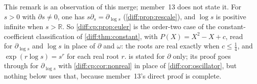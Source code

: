 \documentclass[11pt,letterpaper]{article}
\numberwithin{equation}{section}
\theoremstyle{definition}
\theoremstyle{remark}
\newcommand{\R}{\mathbb R}
\newcommand{\der}{\partial}
\begin{document}
\begin{remark}
\label{diff:cp:rem:constant}
This remark is an observation of this merge; member~13 does not state it. For
$s>0$ with $\der s\neq0$, one has
$s\der_{s}=\der_{\log s}$ (\cref{diff:prop:rescale}), and
$\log s$ is positive infinite when $s>\R$. So
\cref{diff:cp:prop:euler} is the order-two case of the constant-coefficient
classification of \cref{diff:thm:constant}, with $P(X)=X^{2}-X+c$, read for
$\der_{\log s}$ and $\log s$ in place of $\der$ and $\omega$:
the roots are real exactly when $c\leq\frac14$, and
$\exp(r\log s)=s^{r}$ for each real root $r$.
 is stated for $\der$ only; its proof
goes through for $\der_{\log s}$ with \cref{diff:cp:cor:nonreal} in place of
\cref{diff:cor:oscillator}, but nothing below uses that, because member~13's
direct proof is complete.
\end{remark}
\end{document}
